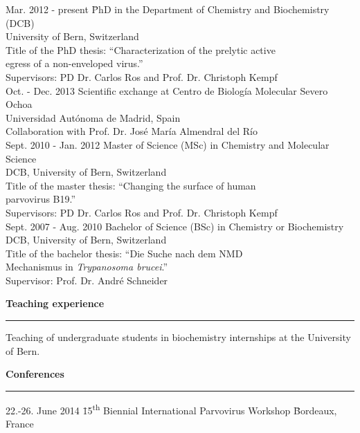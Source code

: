\normalsize
\vspace{-0.7cm}
\begin{tabbing}
Mar. 2012 - present \hspace*{0.9cm} \= PhD in the Department of Chemistry and Biochemistry (DCB) \\ 
\> University of Bern, Switzerland  \\
\> Title of the PhD thesis: ``Characterization of the prelytic active \\ 
\> egress of a non-enveloped virus.'' \\
\> Supervisors: PD Dr. Carlos Ros and Prof. Dr. Christoph Kempf \\ [0.3cm]
Oct. - Dec. 2013 \> Scientific exchange at Centro de Biología Molecular Severo Ochoa \\
\> Universidad Autónoma de Madrid, Spain \\
\> Collaboration with Prof. Dr. José María Almendral del Río \\ [0.3cm]
Sept. 2010 - Jan. 2012 \> Master of Science (MSc) in Chemistry and Molecular Science \\
\> DCB, University of Bern, Switzerland  \\
\> Title of the master thesis: ``Changing the surface of human \\ \> parvovirus B19.'' \\
\> Supervisors: PD Dr. Carlos Ros and Prof. Dr. Christoph Kempf \\ [0.3cm]
Sept. 2007 - Aug. 2010 \> Bachelor of Science (BSc) in Chemistry or Biochemistry \\
\> DCB, University of Bern, Switzerland  \\
\> Title of the bachelor thesis: ``Die Suche nach dem NMD \\
\> Mechanismus in \textit{Trypanosoma brucei}.'' \\
\> Supervisor: Prof. Dr. André Schneider
\end{tabbing}

\vspace{0.2 cm}
\large
\textbf{Teaching experience}
\noindent\rule[3mm]{\linewidth}{1pt}

\normalsize
\vspace{-0.2cm}
Teaching of undergraduate students in biochemistry internships at the University of Bern.

\vspace{0.475 cm}
\large
\textbf{Conferences}
\noindent\rule[3mm]{\linewidth}{1pt}

\normalsize
\vspace{-0.6 cm}
\begin{tabbing}
22.-26. June 2014 \hspace{1.27 cm} \= 15\textsuperscript{th} Biennial International Parvovirus Workshop \hspace{0.1 cm} \= Bordeaux, France
\end{tabbing}



